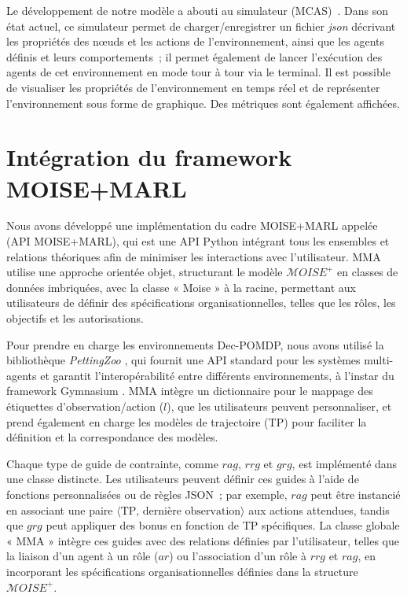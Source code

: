 Le développement de notre modèle a abouti au simulateur  (MCAS)~\cite{MCASWebsite}. Dans son état actuel, ce simulateur permet de charger/enregistrer un fichier \textit{json} décrivant les propriétés des nœuds et les actions de l'environnement, ainsi que les agents définis et leurs comportements~; il permet également de lancer l'exécution des agents de cet environnement en mode tour à tour via le terminal. Il est possible de visualiser les propriétés de l'environnement en temps réel et de représenter l'environnement sous forme de graphique. Des métriques sont également affichées.



\section{Intégration du framework MOISE+MARL}

Nous avons développé une implémentation du cadre MOISE+MARL appelée ~\hyperref[fn:github]{\footnotemark[1]} (API MOISE+MARL), qui est une API Python intégrant tous les ensembles et relations théoriques afin de minimiser les interactions avec l'utilisateur. MMA utilise une approche orientée objet, structurant le modèle $\mathcal{M}OISE^+$ en classes de données imbriquées, avec la classe « Moise » à la racine, permettant aux utilisateurs de définir des spécifications organisationnelles, telles que les rôles, les objectifs et les autorisations.

Pour prendre en charge les environnements Dec-POMDP, nous avons utilisé la bibliothèque \textit{PettingZoo} \cite{terry2020pettingzoo}, qui fournit une API standard pour les systèmes multi-agents et garantit l'interopérabilité entre différents environnements, à l'instar du framework Gymnasium \cite{kwiatkowski2024}. MMA intègre un dictionnaire pour le mappage des étiquettes d'observation/action ($l$), que les utilisateurs peuvent personnaliser, et prend également en charge les modèles de trajectoire (TP) pour faciliter la définition et la correspondance des modèles.

Chaque type de guide de contrainte, comme $rag$, $rrg$ et $grg$, est implémenté dans une classe distincte. Les utilisateurs peuvent définir ces guides à l'aide de fonctions personnalisées ou de règles JSON~; par exemple, $rag$ peut être instancié en associant une paire $\langle \text{TP, dernière observation} \rangle$ aux actions attendues, tandis que $grg$ peut appliquer des bonus en fonction de TP spécifiques. La classe globale « MMA » intègre ces guides avec des relations définies par l'utilisateur, telles que la liaison d'un agent à un rôle ($ar$) ou l'association d'un rôle à $rrg$ et $rag$, en incorporant les spécifications organisationnelles définies dans la structure $\mathcal{M}OISE^+$.

